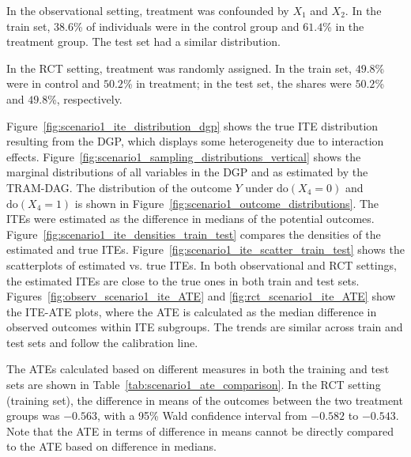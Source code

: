 In the observational setting, treatment was confounded by $X_1$ and $X_2$. In the train set, $38.6$\% of individuals were in the control group and $61.4$\% in the treatment group. The test set had a similar distribution.

In the RCT setting, treatment was randomly assigned. In the train set, $49.8$\% were in control and $50.2$\% in treatment; in the test set, the shares were $50.2$\% and $49.8$\%, respectively.

Figure~\ref{fig:scenario1_ite_distribution_dgp} shows the true ITE distribution resulting from the DGP, which displays some heterogeneity due to interaction effects. Figure~\ref{fig:scenario1_sampling_distributions_vertical} shows the marginal distributions of all variables in the DGP and as estimated by the TRAM-DAG. The distribution of the outcome $Y$ under $\text{do}(X_4 = 0)$ and $\text{do}(X_4 = 1)$ is shown in Figure~\ref{fig:scenario1_outcome_distributions}. The ITEs were estimated as the difference in medians of the potential outcomes. Figure~\ref{fig:scenario1_ite_densities_train_test} compares the densities of the estimated and true ITEs. Figure~\ref{fig:scenario1_ite_scatter_train_test} shows the scatterplots of estimated vs. true ITEs. In both observational and RCT settings, the estimated ITEs are close to the true ones in both train and test sets. Figures~\ref{fig:observ_scenario1_ite_ATE} and \ref{fig:rct_scenario1_ite_ATE} show the ITE-ATE plots, where the ATE is calculated as the median difference in observed outcomes within ITE subgroups. The trends are similar across train and test sets and follow the calibration line.



The ATEs calculated based on different measures in both the training and test sets are shown in Table~\ref{tab:scenario1_ate_comparison}. In the RCT setting (training set), the difference in means of the outcomes between the two treatment groups was 
$-0.563$, with a 95\% Wald confidence interval from 
$-0.582$ to 
$-0.543$. Note that the ATE in terms of difference in means cannot be directly compared to the ATE based on difference in medians.



